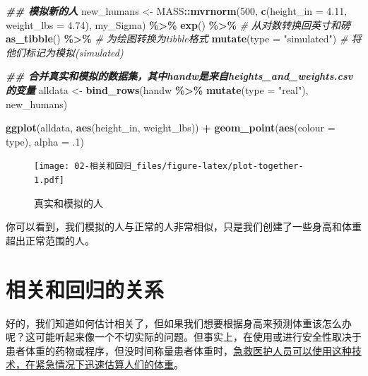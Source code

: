 \documentclass[
]{book}
\newenvironment{Shaded}{\begin{snugshade}}{\end{snugshade}}
\newcommand{\AttributeTok}[1]{\textcolor[rgb]{0.13,0.29,0.53}{#1}}
\newcommand{\CommentTok}[1]{\textcolor[rgb]{0.56,0.35,0.01}{\textit{#1}}}
\newcommand{\DecValTok}[1]{\textcolor[rgb]{0.00,0.00,0.81}{#1}}
\newcommand{\DocumentationTok}[1]{\textcolor[rgb]{0.56,0.35,0.01}{\textbf{\textit{#1}}}}
\newcommand{\FloatTok}[1]{\textcolor[rgb]{0.00,0.00,0.81}{#1}}
\newcommand{\FunctionTok}[1]{\textcolor[rgb]{0.13,0.29,0.53}{\textbf{#1}}}
\newcommand{\NormalTok}[1]{#1}
\newcommand{\OtherTok}[1]{\textcolor[rgb]{0.56,0.35,0.01}{#1}}
\newcommand{\SpecialCharTok}[1]{\textcolor[rgb]{0.81,0.36,0.00}{\textbf{#1}}}
\newcommand{\StringTok}[1]{\textcolor[rgb]{0.31,0.60,0.02}{#1}}
\begin{document}
\begin{Shaded}
\begin{Highlighting}[]
\DocumentationTok{\#\# 模拟新的人}
\NormalTok{new\_humans }\OtherTok{\textless{}{-}}\NormalTok{ MASS}\SpecialCharTok{::}\FunctionTok{mvrnorm}\NormalTok{(}\DecValTok{500}\NormalTok{, }
                            \FunctionTok{c}\NormalTok{(}\AttributeTok{height\_in =} \FloatTok{4.11}\NormalTok{, }\AttributeTok{weight\_lbs =} \FloatTok{4.74}\NormalTok{),}
\NormalTok{                            my\_Sigma) }\SpecialCharTok{\%\textgreater{}\%}
  \FunctionTok{exp}\NormalTok{() }\SpecialCharTok{\%\textgreater{}\%} \CommentTok{\# 从对数转换回英寸和磅}
  \FunctionTok{as\_tibble}\NormalTok{() }\SpecialCharTok{\%\textgreater{}\%} \CommentTok{\# 为绘图转换为tibble格式}
  \FunctionTok{mutate}\NormalTok{(}\AttributeTok{type =} \StringTok{"simulated"}\NormalTok{) }\CommentTok{\# 将他们标记为模拟(simulated)}

\DocumentationTok{\#\# 合并真实和模拟的数据集，其中handw是来自heights\_and\_weights.csv的变量}
\NormalTok{alldata }\OtherTok{\textless{}{-}} \FunctionTok{bind\_rows}\NormalTok{(handw }\SpecialCharTok{\%\textgreater{}\%} \FunctionTok{mutate}\NormalTok{(}\AttributeTok{type =} \StringTok{"real"}\NormalTok{), }
\NormalTok{                     new\_humans)}

\FunctionTok{ggplot}\NormalTok{(alldata, }\FunctionTok{aes}\NormalTok{(height\_in, weight\_lbs)) }\SpecialCharTok{+}
  \FunctionTok{geom\_point}\NormalTok{(}\FunctionTok{aes}\NormalTok{(}\AttributeTok{colour =}\NormalTok{ type), }\AttributeTok{alpha =}\NormalTok{ .}\DecValTok{1}\NormalTok{)}
\end{Highlighting}
\end{Shaded}

\begin{figure}
\centering
\texttt{[image: 02-相关和回归\_files/figure-latex/plot-together-1.pdf]}
\caption{\label{fig:plot-together}真实和模拟的人}
\end{figure}

你可以看到，我们模拟的人与正常的人非常相似，只是我们创建了一些身高和体重超出正常范围的人。

\hypertarget{ux76f8ux5173ux548cux56deux5f52ux7684ux5173ux7cfb}{%
\section{相关和回归的关系}\label{ux76f8ux5173ux548cux56deux5f52ux7684ux5173ux7cfb}}

好的，我们知道如何估计相关了，但如果我们想要根据身高来预测体重该怎么办呢？这可能听起来像一个不切实际的问题。但事实上，在使用或进行安全性取决于患者体重的药物或程序，但没时间称量患者体重时，\href{https://link.springer.com/article/10.1186/s12245-018-0212-9}{急救医护人员可以使用这种技术，在紧急情况下迅速估算人们的体重}。
\end{document}

